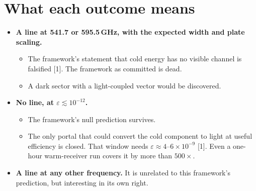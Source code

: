 \documentclass[10pt]{article}
\begin{document}
\section{What each outcome means}
\begin{itemize}
\item \textbf{A line at 541.7 or 595.5\,GHz, with the expected width and plate scaling.}
  \begin{itemize}
  \item The framework's statement that cold energy has no visible channel is falsified [1]. The framework as committed is dead.
  \item A dark sector with a light-coupled vector would be discovered.
  \end{itemize}
\item \textbf{No line, at $\varepsilon\lesssim10^{-12}$.}
  \begin{itemize}
  \item The framework's null prediction survives.
  \item The only portal that could convert the cold component to light at useful efficiency is closed. That window needs $\varepsilon\approx4$--$6\times10^{-9}$ [1]. Even a one-hour warm-receiver run covers it by more than $500\times$.
  \end{itemize}
\item \textbf{A line at any other frequency.} It is unrelated to this framework's prediction, but interesting in its own right.
\end{itemize}
\end{document}

